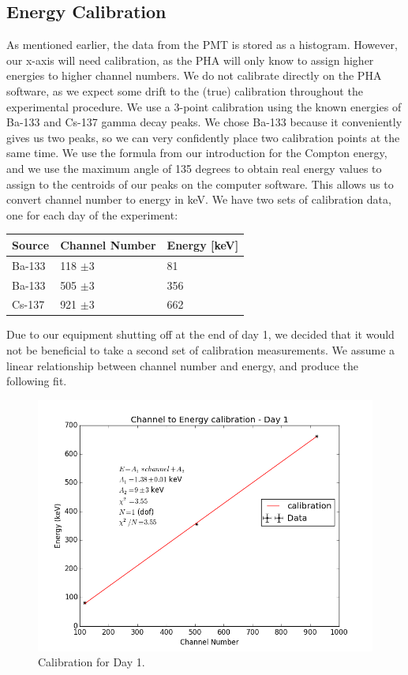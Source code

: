 \documentclass{article}
\begin{document}
\subsection{Energy Calibration}
As mentioned earlier, the data from the PMT is stored as a histogram. However, our x-axis will need calibration, as the PHA will only know to assign higher energies to higher channel numbers. We do not calibrate directly on the PHA software, as we expect some drift to the (true) calibration throughout the experimental procedure. We use a 3-point calibration using the known energies of Ba-133 and Cs-137 gamma decay peaks. We chose Ba-133 because it conveniently gives us two peaks, so we can very confidently place two calibration points at the same time. We use the formula from our introduction for the Compton energy, and we use the maximum angle of 135 degrees to obtain real energy values to assign to the centroids of our peaks on the computer software. This allows us to convert channel number to energy in keV. We have two sets of calibration data, one for each day of the experiment:

\begin{center}
    \centering
     \label{tab:title} 
    \begin{tabular}{| l | l | l |}
    \hline
    Source & Channel Number & Energy [keV] \\ \hline
    Ba-133 & 118 $\pm 3$ & 81 \\ \hline
    Ba-133 & 505 $\pm 3$ & 356 \\ \hline
    Cs-137 & 921 $\pm 3$ & 662 \\ \hline
    \end{tabular}
\end{center}

Due to our equipment shutting off at the end of day 1, we decided that it would not be beneficial to take a second set of calibration measurements. We assume a linear relationship between channel number and energy, and produce the following fit.

\begin{figure}[!htb]
	\centering
	\includegraphics[scale=.75]{plots/cal1.png}
  	\caption{Calibration for Day 1.} 
 	\label{cal1}
\end{figure}
\end{document}
